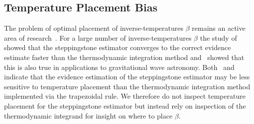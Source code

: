 \subsection{Temperature Placement Bias}
The problem of optimal placement of inverse-temperatures $\beta$ remains an active area of research~\citep{xie2010improving,annis2019thermodynamic}. For a large number of inverse-temperatures $\beta$ the study of~\cite{xie2010improving} showed that the steppingstone estimator converges to the correct evidence estimate faster than the thermodynamic integration method and~\cite{Russel:2018pqv} showed that this is also true in applications to gravitational wave astronomy. Both~\cite{xie2010improving} and~\cite{Russel:2018pqv} indicate that the evidence estimation of the steppingstone estimator may be less sensitive to temperature placement than the thermodynamic integration method implemented via the trapezoidal rule. We therefore do not inspect temperature placement for the steppingstone estimator but instead rely on inspection of the thermodynamic integrand for insight on where to place $\beta$.

